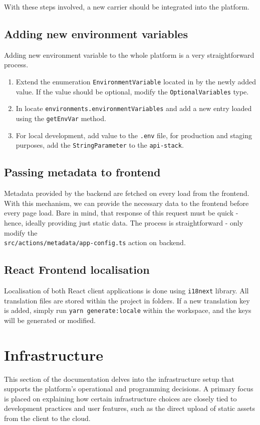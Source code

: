 With these steps involved, a new carrier should be integrated into the platform.

\subsection{Adding new environment variables}
Adding new environment variable to the whole platform is a very straightforward process.
\begin{enumerate}
    \item Extend the enumeration \texttt{EnvironmentVariable} located in  by the newly added value. If the value should be optional, modify the \texttt{OptionalVariables} type.
    \item In  locate \texttt{environments.environmentVariables} and add a new entry loaded using the \texttt{getEnvVar} method.
    \item For local development, add value to the \texttt{.env} file, for production and staging purposes, add the \texttt{StringParameter} to the \texttt{api-stack}.
\end{enumerate}

\subsection{Passing metadata to frontend}
Metadata provided by the backend are fetched on every load from the frontend.
With this mechanism, we can provide the necessary data to the frontend before every page load.
Bare in mind, that response of this request must be quick - hence, ideally providing just static data. 
The process is straightforward - only modify the \\ \texttt{src/actions/metadata/app-config.ts} action on backend.

\subsection{React Frontend localisation}
Localisation of both React client applications is done using \texttt{i18next} library.  
All translation files are stored within the project in  folders.
If a new translation key is added, simply run \texttt{yarn generate:locale} within the workspace, and the keys will be generated or modified. 

\section{Infrastructure}
\label{attachments:programming-platform.infrastructure}
This section of the documentation delves into the infrastructure setup that supports the platform's operational and programming decisions. A primary focus is placed on explaining how certain infrastructure choices are closely tied to development practices and user features, such as the direct upload of static assets from the client to the cloud. 

